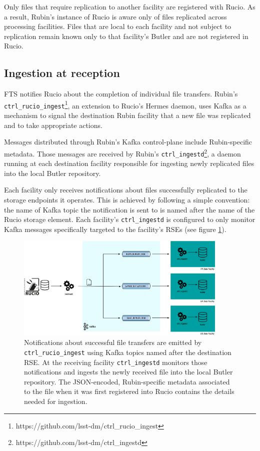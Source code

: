 \documentclass{webofc}
\begin{document}
Only files that require replication to another facility are registered with Rucio. As a result, Rubin’s instance of Rucio is aware only of files replicated across processing facilities. Files that are local to each facility and not subject to replication remain known only to that facility's Butler and are not registered in Rucio.

\subsection{Ingestion at reception}
\label{ingestion}

FTS notifies Rucio about the completion of individual file transfers. Rubin's \texttt{ctrl\_rucio\_ingest}\footnote{https://github.com/lsst-dm/ctrl\_rucio\_ingest}, an extension to Rucio's Hermes daemon, uses Kafka as a mechanism to signal the destination Rubin facility that a new file was replicated and to take appropriate actions.

Messages distributed through Rubin's Kafka control-plane include Rubin-specific metadata. Those messages are received by Rubin's \texttt{ctrl\_ingestd}\footnote{https://github.com/lsst-dm/ctrl\_ingestd}, a daemon running at each destination facility responsible for ingesting newly replicated files into the local Butler repository.

Each facility only receives notifications about files successfully replicated to the storage endpoints it operates. This is achieved by following a simple convention: the name of Kafka topic the notification is sent to is named after the name of the Rucio storage element. Each facility's \texttt{ctrl\_ingestd} is configured to only monitor Kafka messages specifically targeted to the facility's RSEs (see figure \ref{fig:kafka-control-plane}).

\begin{figure}[h]
\includegraphics[width=0.9\textwidth, center]{images/Hermes and Ingestd.png}
\caption{Notifications about successful file transfers are emitted by \texttt{ctrl\_rucio\_ingest} using Kafka topics named after the destination RSE. At the receiving facility \texttt{ctrl\_ingestd} monitors those notifications and ingests the newly received file into the local Butler repository. The JSON-encoded, Rubin-specific metadata associated to the file when it was first registered into Rucio contains the details needed for ingestion.}
\label{fig:kafka-control-plane}
\end{figure}
\end{document}
